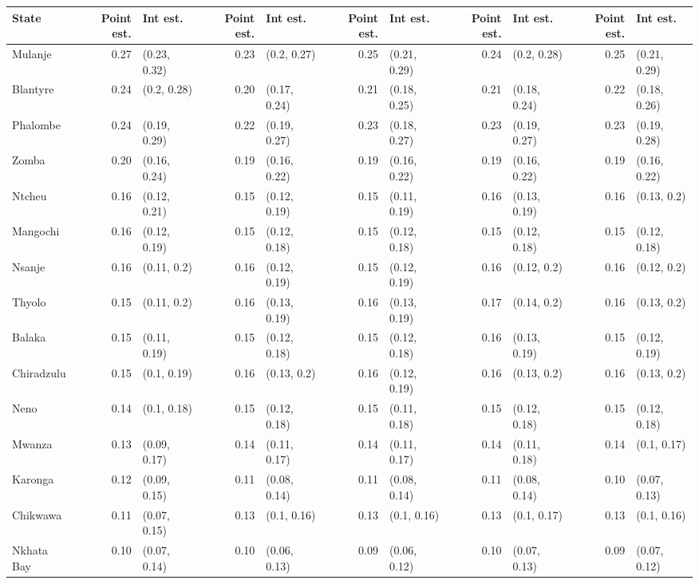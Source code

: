 
\begin{tabular}{lrlrlrlrlrl}
\toprule
State & Point est. & Int est. & Point est. & Int est. & Point est. & Int est. & Point est. & Int est. & Point est. & Int est.\\
\midrule
Mulanje & 0.27 & (0.23, 0.32) & 0.23 & (0.2, 0.27) & 0.25 & (0.21, 0.29) & 0.24 & (0.2, 0.28) & 0.25 & (0.21, 0.29)\\
Blantyre & 0.24 & (0.2, 0.28) & 0.20 & (0.17, 0.24) & 0.21 & (0.18, 0.25) & 0.21 & (0.18, 0.24) & 0.22 & (0.18, 0.26)\\
Phalombe & 0.24 & (0.19, 0.29) & 0.22 & (0.19, 0.27) & 0.23 & (0.18, 0.27) & 0.23 & (0.19, 0.27) & 0.23 & (0.19, 0.28)\\
Zomba & 0.20 & (0.16, 0.24) & 0.19 & (0.16, 0.22) & 0.19 & (0.16, 0.22) & 0.19 & (0.16, 0.22) & 0.19 & (0.16, 0.22)\\
Ntcheu & 0.16 & (0.12, 0.21) & 0.15 & (0.12, 0.19) & 0.15 & (0.11, 0.19) & 0.16 & (0.13, 0.19) & 0.16 & (0.13, 0.2)\\
Mangochi & 0.16 & (0.12, 0.19) & 0.15 & (0.12, 0.18) & 0.15 & (0.12, 0.18) & 0.15 & (0.12, 0.18) & 0.15 & (0.12, 0.18)\\
Nsanje & 0.16 & (0.11, 0.2) & 0.16 & (0.12, 0.19) & 0.15 & (0.12, 0.19) & 0.16 & (0.12, 0.2) & 0.16 & (0.12, 0.2)\\
Thyolo & 0.15 & (0.11, 0.2) & 0.16 & (0.13, 0.19) & 0.16 & (0.13, 0.19) & 0.17 & (0.14, 0.2) & 0.16 & (0.13, 0.2)\\
Balaka & 0.15 & (0.11, 0.19) & 0.15 & (0.12, 0.18) & 0.15 & (0.12, 0.18) & 0.16 & (0.13, 0.19) & 0.15 & (0.12, 0.19)\\
Chiradzulu & 0.15 & (0.1, 0.19) & 0.16 & (0.13, 0.2) & 0.16 & (0.12, 0.19) & 0.16 & (0.13, 0.2) & 0.16 & (0.13, 0.2)\\
Neno & 0.14 & (0.1, 0.18) & 0.15 & (0.12, 0.18) & 0.15 & (0.11, 0.18) & 0.15 & (0.12, 0.18) & 0.15 & (0.12, 0.18)\\
Mwanza & 0.13 & (0.09, 0.17) & 0.14 & (0.11, 0.17) & 0.14 & (0.11, 0.17) & 0.14 & (0.11, 0.18) & 0.14 & (0.1, 0.17)\\
Karonga & 0.12 & (0.09, 0.15) & 0.11 & (0.08, 0.14) & 0.11 & (0.08, 0.14) & 0.11 & (0.08, 0.14) & 0.10 & (0.07, 0.13)\\
Chikwawa & 0.11 & (0.07, 0.15) & 0.13 & (0.1, 0.16) & 0.13 & (0.1, 0.16) & 0.13 & (0.1, 0.17) & 0.13 & (0.1, 0.16)\\
Nkhata Bay & 0.10 & (0.07, 0.14) & 0.10 & (0.06, 0.13) & 0.09 & (0.06, 0.12) & 0.10 & (0.07, 0.13) & 0.09 & (0.07, 0.12)\\

\end{tabular}
